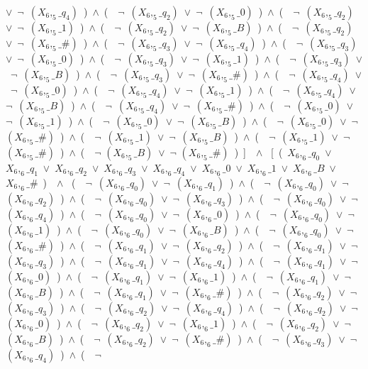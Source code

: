 ﻿\documentclass[a4paper,10pt]{article}
\begin{document}
$\vee$\ $\neg$\ $(X_6,_5\_q_4)$\ )\ $\wedge$\ (\ \ $\neg$\ $(X_6,_5\_q_2)$\ $\vee$\ $\neg$\ $(X_6,_5\_0)$\ )\ $\wedge$\ (\ \ $\neg$\ $(X_6,_5\_q_2)$\ $\vee$\ $\neg$\ $(X_6,_5\_1)$\ )\ $\wedge$\ (\ \ $\neg$\ $(X_6,_5\_q_2)$\ $\vee$\ $\neg$\ $(X_6,_5\_B)$\ )\ $\wedge$\ (\ \ $\neg$\ $(X_6,_5\_q_2)$\ $\vee$\ $\neg$\ $(X_6,_5\_\#)$\ )\ $\wedge$\ (\ \ $\neg$\ $(X_6,_5\_q_3)$\ $\vee$\ $\neg$\ $(X_6,_5\_q_4)$\ )\ $\wedge$\ (\ \ $\neg$\ $(X_6,_5\_q_3)$\ $\vee$\ $\neg$\ $(X_6,_5\_0)$\ )\ $\wedge$\ (\ \ $\neg$\ $(X_6,_5\_q_3)$\ $\vee$\ $\neg$\ $(X_6,_5\_1)$\ )\ $\wedge$\ (\ \ $\neg$\ $(X_6,_5\_q_3)$\ $\vee$\ $\neg$\ $(X_6,_5\_B)$\ )\ $\wedge$\ (\ \ $\neg$\ $(X_6,_5\_q_3)$\ $\vee$\ $\neg$\ $(X_6,_5\_\#)$\ )\ $\wedge$\ (\ \ $\neg$\ $(X_6,_5\_q_4)$\ $\vee$\ $\neg$\ $(X_6,_5\_0)$\ )\ $\wedge$\ (\ \ $\neg$\ $(X_6,_5\_q_4)$\ $\vee$\ $\neg$\ $(X_6,_5\_1)$\ )\ $\wedge$\ (\ \ $\neg$\ $(X_6,_5\_q_4)$\ $\vee$\ $\neg$\ $(X_6,_5\_B)$\ )\ $\wedge$\ (\ \ $\neg$\ $(X_6,_5\_q_4)$\ $\vee$\ $\neg$\ $(X_6,_5\_\#)$\ )\ $\wedge$\ (\ \ $\neg$\ $(X_6,_5\_0)$\ $\vee$\ $\neg$\ $(X_6,_5\_1)$\ )\ $\wedge$\ (\ \ $\neg$\ $(X_6,_5\_0)$\ $\vee$\ $\neg$\ $(X_6,_5\_B)$\ )\ $\wedge$\ (\ \ $\neg$\ $(X_6,_5\_0)$\ $\vee$\ $\neg$\ $(X_6,_5\_\#)$\ )\ $\wedge$\ (\ \ $\neg$\ $(X_6,_5\_1)$\ $\vee$\ $\neg$\ $(X_6,_5\_B)$\ )\ $\wedge$\ (\ \ $\neg$\ $(X_6,_5\_1)$\ $\vee$\ $\neg$\ $(X_6,_5\_\#)$\ )\ $\wedge$\ (\ \ $\neg$ $(X_6,_5\_B)$\ $\vee$\ $\neg$ $(X_6,_5\_\#)$\ )\ ]\ \ $\wedge$ \ [\ (\ $X_6,_6\_q_0$\ $\vee$\ $X_6,_6\_q_1$\ $\vee$\ $X_6,_6\_q_2$\ $\vee$\ $X_6,_6\_q_3$\ $\vee$\ $X_6,_6\_q_4$\ $\vee$\ $X_6,_6\_0$\ $\vee$\ $X_6,_6\_1$\ $\vee$\ $X_6,_6\_B$\ $\vee$\ $X_6,_6\_\#$\ )\ \ $\wedge$ \ (\ \ $\neg$\ $(X_6,_6\_q_0)$\ $\vee$\ $\neg$\ $(X_6,_6\_q_1)$\ )\ $\wedge$\ (\ \ $\neg$\ $(X_6,_6\_q_0)$\ $\vee$\ $\neg$\ $(X_6,_6\_q_2)$\ )\ $\wedge$\ (\ \ $\neg$\ $(X_6,_6\_q_0)$\ $\vee$\ $\neg$\ $(X_6,_6\_q_3)$\ )\ $\wedge$\ (\ \ $\neg$\ $(X_6,_6\_q_0)$\ $\vee$\ $\neg$\ $(X_6,_6\_q_4)$\ )\ $\wedge$\ (\ \ $\neg$\ $(X_6,_6\_q_0)$\ $\vee$\ $\neg$\ $(X_6,_6\_0)$\ )\ $\wedge$\ (\ \ $\neg$\ $(X_6,_6\_q_0)$\ $\vee$\ $\neg$\ $(X_6,_6\_1)$\ )\ $\wedge$\ (\ \ $\neg$\ $(X_6,_6\_q_0)$\ $\vee$\ $\neg$\ $(X_6,_6\_B)$\ )\ $\wedge$\ (\ \ $\neg$\ $(X_6,_6\_q_0)$\ $\vee$\ $\neg$\ $(X_6,_6\_\#)$\ )\ $\wedge$\ (\ \ $\neg$\ $(X_6,_6\_q_1)$\ $\vee$\ $\neg$\ $(X_6,_6\_q_2)$\ )\ $\wedge$\ (\ \ $\neg$\ $(X_6,_6\_q_1)$\ $\vee$\ $\neg$\ $(X_6,_6\_q_3)$\ )\ $\wedge$\ (\ \ $\neg$\ $(X_6,_6\_q_1)$\ $\vee$\ $\neg$\ $(X_6,_6\_q_4)$\ )\ $\wedge$\ (\ \ $\neg$\ $(X_6,_6\_q_1)$\ $\vee$\ $\neg$\ $(X_6,_6\_0)$\ )\ $\wedge$\ (\ \ $\neg$\ $(X_6,_6\_q_1)$\ $\vee$\ $\neg$\ $(X_6,_6\_1)$\ )\ $\wedge$\ (\ \ $\neg$\ $(X_6,_6\_q_1)$\ $\vee$\ $\neg$\ $(X_6,_6\_B)$\ )\ $\wedge$\ (\ \ $\neg$\ $(X_6,_6\_q_1)$\ $\vee$\ $\neg$\ $(X_6,_6\_\#)$\ )\ $\wedge$\ (\ \ $\neg$\ $(X_6,_6\_q_2)$\ $\vee$\ $\neg$\ $(X_6,_6\_q_3)$\ )\ $\wedge$\ (\ \ $\neg$\ $(X_6,_6\_q_2)$\ $\vee$\ $\neg$\ $(X_6,_6\_q_4)$\ )\ $\wedge$\ (\ \ $\neg$\ $(X_6,_6\_q_2)$\ $\vee$\ $\neg$\ $(X_6,_6\_0)$\ )\ $\wedge$\ (\ \ $\neg$\ $(X_6,_6\_q_2)$\ $\vee$\ $\neg$\ $(X_6,_6\_1)$\ )\ $\wedge$\ (\ \ $\neg$\ $(X_6,_6\_q_2)$\ $\vee$\ $\neg$\ $(X_6,_6\_B)$\ )\ $\wedge$\ (\ \ $\neg$\ $(X_6,_6\_q_2)$\ $\vee$\ $\neg$\ $(X_6,_6\_\#)$\ )\ $\wedge$\ (\ \ $\neg$\ $(X_6,_6\_q_3)$\ $\vee$\ $\neg$\ $(X_6,_6\_q_4)$\ )\ $\wedge$\ (\ \ $\neg$\ 
\end{document}
